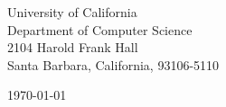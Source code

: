 \begin{minipage}{0.49\textwidth}
\begin{flushleft}
\noindent
University of California\\
Department of Computer Science\\
2104 Harold Frank Hall\\
Santa Barbara, California, 93106-5110
\end{flushleft}
\end{minipage}
\begin{minipage}{0.47\textwidth}
\begin{flushright}
\today
\end{flushright}
\end{minipage} \\

\newcommand{\univ}{University of California, Santa Barbara}
\newcommand{\univshort}{UCSB}
\newcommand{\degree}{Ph.D.}
\newcommand{\dept}{Computer Science}

